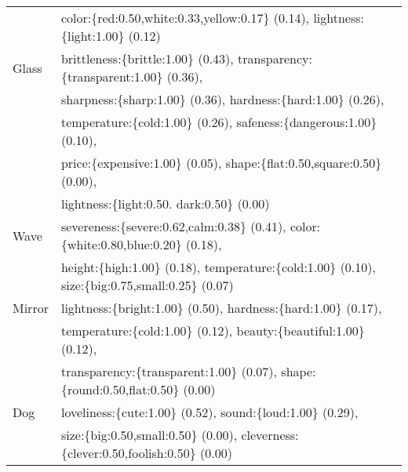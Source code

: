 \begin{table}[t]
\begin{tabular}{l@{}l}
    & color:\{red:0.50,white:0.33,yellow:0.17\} (0.14), lightness:\{light:1.00\} (0.12)\\
    Glass & brittleness:\{brittle:1.00\} (0.43), transparency:\{transparent:1.00\} (0.36),\\
    & sharpness:\{sharp:1.00\} (0.36), hardness:\{hard:1.00\} (0.26), \\
    & temperature:\{cold:1.00\} (0.26), safeness:\{dangerous:1.00\} (0.10),\\
    & price:\{expensive:1.00\} (0.05), shape:\{flat:0.50,square:0.50\} (0.00),\\
    & lightness:\{light:0.50. dark:0.50\} (0.00)\\
    Wave & severeness:\{severe:0.62,calm:0.38\} (0.41), color:\{white:0.80,blue:0.20\} (0.18),\\
    & height:\{high:1.00\} (0.18), temperature:\{cold:1.00\} (0.10),
    size:\{big:0.75,small:0.25\} (0.07)\\
    Mirror & lightness:\{bright:1.00\} (0.50), hardness:\{hard:1.00\} (0.17),\\
    & temperature:\{cold:1.00\} (0.12), beauty:\{beautiful:1.00\} (0.12),\\
    & transparency:\{transparent:1.00\} (0.07), shape:\{round:0.50,flat:0.50\} (0.00)\\
    Dog & loveliness:\{cute:1.00\} (0.52), sound:\{loud:1.00\} (0.29), \\
    & size:\{big:0.50,small:0.50\} (0.00), cleverness:\{clever:0.50,foolish:0.50\} (0.00)\\
    \hline
  \end{tabular}
\end{table}

